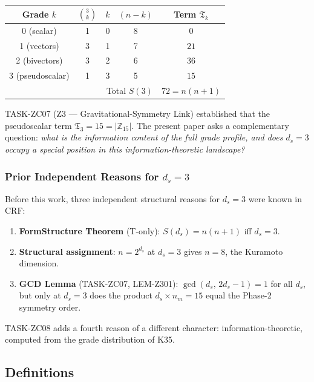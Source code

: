 \documentclass[12pt, a4paper]{article}
\begin{document}
\begin{center}
{\small
\renewcommand{\arraystretch}{1.30}
\begin{tabular}{ccccc}
\toprule
\textbf{Grade} $k$ & $\binom{3}{k}$ & $k$ & $(n-k)$ &
\textbf{Term} $\mathfrak{T}_k$ \\
\midrule
0 (scalar)       & 1 & 0 & 8 & $0$ \\
1 (vectors)      & 3 & 1 & 7 & $21$ \\
2 (bivectors)    & 3 & 2 & 6 & $36$ \\
3 (pseudoscalar) & 1 & 3 & 5 & $15$ \\
\midrule
\multicolumn{4}{r}{Total $S(3)$} & $72 = n(n+1)$ \\
\bottomrule
\end{tabular}
}
\end{center}

TASK-ZC07 (Z3 --- Gravitational-Symmetry Link) established that the
pseudoscalar term $\mathfrak{T}_3 = 15 = |\mathbb{Z}_{15}|$.
The present paper asks a complementary question: \emph{what is
the information content of the full grade profile, and does $d_s=3$
occupy a special position in this information-theoretic landscape?}

\subsubsection{Prior Independent Reasons for $d_s = 3$}

Before this work, three independent structural reasons for $d_s=3$
were known in CRF:

\begin{enumerate}[leftmargin=*]
  \item \textbf{FormStructure Theorem} (T-only): $S(d_s) = n(n+1)$
    iff $d_s = 3$.
  \item \textbf{Structural assignment}: $n = 2^{d_s}$ at $d_s = 3$
    gives $n = 8$, the Kuramoto dimension.
  \item \textbf{GCD Lemma} (TASK-ZC07, LEM-Z301):
    $\gcd(d_s,\, 2d_s-1) = 1$ for all $d_s$, but only at
    $d_s = 3$ does the product $d_s \times n_m = 15$ equal the
    Phase-2 symmetry order.
\end{enumerate}

TASK-ZC08 adds a fourth reason of a different character:
information-theoretic, computed from the grade distribution of K35.

\subsection{Definitions}
\label{sec:defs}
\end{document}
